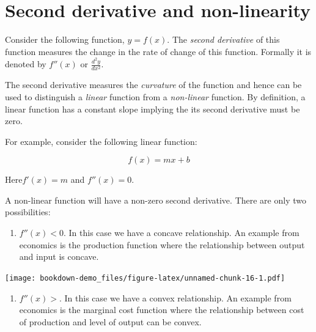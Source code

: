 \documentclass[]{book}
\providecommand{\tightlist}{%
  \setlength{\itemsep}{0pt}\setlength{\parskip}{0pt}}
\theoremstyle{definition}
\theoremstyle{definition}
\theoremstyle{definition}
\theoremstyle{remark}
\let\BeginKnitrBlock\begin \let\EndKnitrBlock\end
\begin{document}
\hypertarget{second-derivative-and-non-linearity}{%
\section{Second derivative and non-linearity}\label{second-derivative-and-non-linearity}}

\BeginKnitrBlock{definition}[Second derivative of a function]
\protect\hypertarget{def:unnamed-chunk-14}{}{\label{def:unnamed-chunk-14} {} }Consider the following function, \(y=f(x)\). The \emph{second derivative} of this function measures the change in the rate of change of this function. Formally it is denoted by \(f''(x)\) or \(\displaystyle{\frac{d^2y}{dx^2}}\).
\EndKnitrBlock{definition}

The second derivative measures the \emph{curvature} of the function and hence can be used to distinguish a \emph{linear} function from a \emph{non-linear} function. By definition, a linear function has a constant slope implying the its second derivative must be zero.

\BeginKnitrBlock{example}
\protect\hypertarget{exm:unnamed-chunk-15}{}{\label{exm:unnamed-chunk-15} }For example, consider the following linear function:

\[f(x) = mx +b\]

Here\(f'(x)=m\) and \(f''(x)=0\).
\EndKnitrBlock{example}

A non-linear function will have a non-zero second derivative. There are only two possibilities:

\begin{enumerate}
\def\labelenumi{\arabic{enumi}.}
\tightlist
\item
  \(f''(x)<0\). In this case we have a concave relationship. An example from economics is the production function where the relationship between output and input is concave.
\end{enumerate}

\texttt{[image: bookdown-demo\_files/figure-latex/unnamed-chunk-16-1.pdf]}

\begin{enumerate}
\def\labelenumi{\arabic{enumi}.}
\setcounter{enumi}{1}
\tightlist
\item
  \(f''(x)>\). In this case we have a convex relationship. An example from economics is the marginal cost function where the relationship between cost of production and level of output can be convex.
\end{enumerate}
\end{document}
